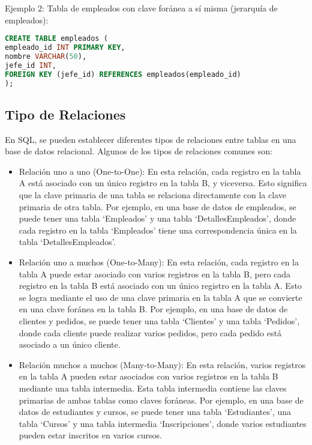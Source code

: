 \documentclass[executivepaper]{article}
\begin{document}
Ejemplo 2: Tabla de empleados con clave foránea a sí misma (jerarquía de empleados):
\begin{lstlisting}[language=SQL]
CREATE TABLE empleados (
empleado_id INT PRIMARY KEY,
nombre VARCHAR(50),
jefe_id INT,
FOREIGN KEY (jefe_id) REFERENCES empleados(empleado_id)
);
\end{lstlisting}

\subsection{Tipo de Relaciones}

En SQL, se pueden establecer diferentes tipos de relaciones entre tablas en una base de datos relacional. Algunos de los tipos de relaciones comunes son:

\begin{itemize}
\item Relación uno a uno (One-to-One): En esta relación, cada registro en la tabla A está asociado con un único registro en la tabla B, y viceversa. Esto significa que la clave primaria de una tabla se relaciona directamente con la clave primaria de otra tabla. Por ejemplo, en una base de datos de empleados, se puede tener una tabla \enquote*{Empleados} y una tabla \enquote*{DetallesEmpleados}, donde cada registro en la tabla \enquote*{Empleados} tiene una correspondencia única en la tabla \enquote*{DetallesEmpleados}.

\item Relación uno a muchos (One-to-Many): En esta relación, cada registro en la tabla A puede estar asociado con varios registros en la tabla B, pero cada registro en la tabla B está asociado con un único registro en la tabla A. Esto se logra mediante el uso de una clave primaria en la tabla A que se convierte en una clave foránea en la tabla B. Por ejemplo, en una base de datos de clientes y pedidos, se puede tener una tabla \enquote*{Clientes} y una tabla \enquote*{Pedidos}, donde cada cliente puede realizar varios pedidos, pero cada pedido está asociado a un único cliente.

\item Relación muchos a muchos (Many-to-Many): En esta relación, varios registros en la tabla A pueden estar asociados con varios registros en la tabla B mediante una tabla intermedia. Esta tabla intermedia contiene las claves primarias de ambas tablas como claves foráneas. Por ejemplo, en una base de datos de estudiantes y cursos, se puede tener una tabla \enquote*{Estudiantes}, una tabla \enquote*{Cursos} y una tabla intermedia \enquote*{Inscripciones}, donde varios estudiantes pueden estar inscritos en varios cursos.

\end{itemize}
\end{document}
